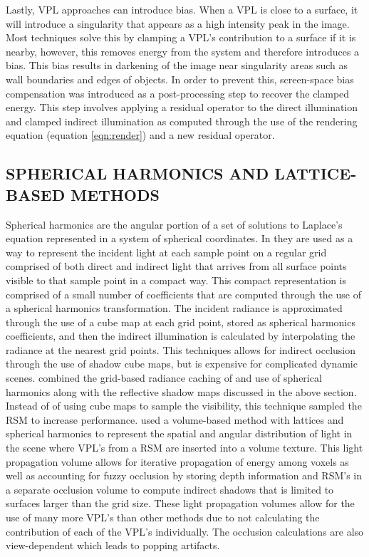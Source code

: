 Lastly, VPL approaches can introduce bias.  When a VPL is close to a surface, it will introduce a singularity that appears as a high intensity peak in the image.  Most techniques solve this by clamping a VPL's contribution to a surface if it is nearby, however, this removes energy from the system and therefore introduces a bias.  This bias results in darkening of the image near singularity areas such as wall boundaries and edges of objects.  In order to prevent this, screen-space bias compensation \cite{Novak2011} was introduced as a post-processing step to recover the clamped energy.  This step involves applying a residual operator to the direct illumination and clamped indirect illumination as computed through the use of the rendering equation (equation \ref{eqn:render}) and a new residual operator.

\subsection{SPHERICAL HARMONICS AND LATTICE-BASED METHODS}

Spherical harmonics are the angular portion of a set of solutions to Laplace's equation represented in a system of spherical coordinates.  In \cite{Nijasure2005} they are used as a way to represent the incident light at each sample point on a regular grid comprised of both direct and indirect light that arrives from all surface points visible to that sample point in a compact way.  This compact representation is comprised of a small number of coefficients that are computed through the use of a spherical harmonics transformation.  The incident radiance is approximated through the use of a cube map at each grid point, stored as spherical harmonics coefficients, and then the indirect illumination is calculated by interpolating the radiance at the nearest grid points.  This techniques allows for indirect occlusion through the use of shadow cube maps, but is expensive for complicated dynamic scenes.  \cite{Papaioannou2011} combined the grid-based radiance caching of \cite{Nijasure2005} and use of spherical harmonics along with the reflective shadow maps discussed in the above section.  Instead of of using cube maps to sample the visibility, this technique sampled the RSM to increase performance.  \cite{Kaplanyan2010} used a volume-based method with lattices and spherical harmonics to represent the spatial and angular distribution of light in the scene where VPL's from a RSM are inserted into a volume texture.  This light propagation volume allows for iterative propagation of energy among voxels as well as accounting for fuzzy occlusion by storing depth information and RSM's in a separate occlusion volume to compute indirect shadows that is limited to surfaces larger than the grid size.  These light propagation volumes allow for the use of many more VPL's than other methods due to not calculating the contribution of each of the VPL's individually.  The occlusion calculations are also view-dependent which leads to popping artifacts.










